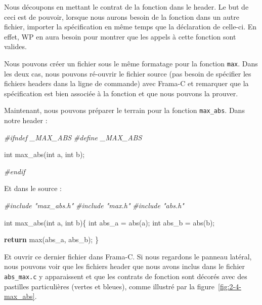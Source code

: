 \documentclass[12pt,francais,]{scrbook}
\newenvironment{Shaded}{}{}
\newcommand{\KeywordTok}[1]{\textcolor[rgb]{0.00,0.44,0.13}{\textbf{{#1}}}}
\newcommand{\DataTypeTok}[1]{\textcolor[rgb]{0.56,0.13,0.00}{{#1}}}
\newcommand{\CommentTok}[1]{\textcolor[rgb]{0.38,0.63,0.69}{\textit{{#1}}}}
\newcommand{\NormalTok}[1]{{#1}}
\begin{document}
Nous découpons en mettant le contrat de la fonction dans le header. Le
but de ceci est de pouvoir, lorsque nous aurons besoin de la fonction
dans un autre fichier, importer la spécification en même temps que la
déclaration de celle-ci. En effet, WP en aura besoin pour montrer que
les appels à cette fonction sont valides.

Nous pouvons créer un fichier sous le même formatage pour la fonction
\texttt{max}. Dans les deux cas, nous pouvons ré-ouvrir le fichier
source (pas besoin de spécifier les fichiers headers dans la ligne de
commande) avec Frama-C et remarquer que la spécification est bien
associée à la fonction et que nous pouvons la prouver.

Maintenant, nous pouvons préparer le terrain pour la fonction
\texttt{max\_abs}. Dans notre header :

\begin{footnotesize}\begin{Shaded}
\begin{Highlighting}[]
\CommentTok{#ifndef _MAX_ABS}
\CommentTok{#define _MAX_ABS}

\DataTypeTok{int} \NormalTok{max_abs(}\DataTypeTok{int} \NormalTok{a, }\DataTypeTok{int} \NormalTok{b);}

\CommentTok{#endif}
\end{Highlighting}
\end{Shaded}\end{footnotesize}

Et dans le source :

\begin{footnotesize}\begin{Shaded}
\begin{Highlighting}[]
\CommentTok{#include "max_abs.h"}
\CommentTok{#include "max.h"}
\CommentTok{#include "abs.h"}

\DataTypeTok{int} \NormalTok{max_abs(}\DataTypeTok{int} \NormalTok{a, }\DataTypeTok{int} \NormalTok{b)\{}
  \DataTypeTok{int} \NormalTok{abs_a = abs(a);}
  \DataTypeTok{int} \NormalTok{abs_b = abs(b);}

  \KeywordTok{return} \NormalTok{max(abs_a, abs_b);}
\NormalTok{\}}
\end{Highlighting}
\end{Shaded}\end{footnotesize}

Et ouvrir ce dernier fichier dans Frama-C. Si nous regardons le panneau
latéral, nous pouvons voir que les fichiers header que nous avons inclus
dans le fichier \texttt{abs\_max.c} y apparaissent et que les contrats
de fonction sont décorés avec des pastilles particulières (vertes et
bleues), comme illustré par la figure~\ref{fig:2-4-max_abs}.
\end{document}
